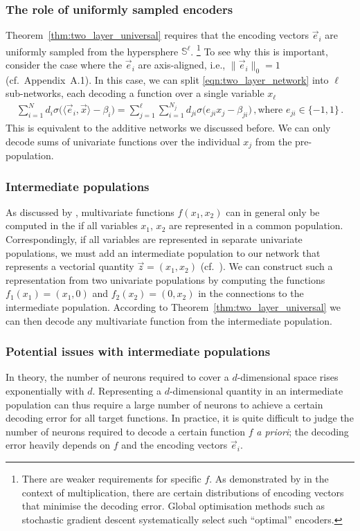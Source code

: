 \subsubsection{The role of uniformly sampled encoders}
Theorem~\ref{thm:two_layer_universal} requires that the encoding vectors $\vec e_i$ are uniformly sampled from the hypersphere $\mathbb{S}^\ell$.%
\footnote{There are weaker requirements for specific $f$.
As demonstrated by \citet{gosmann2015precise} in the context of multiplication, there are certain distributions of encoding vectors that minimise the decoding error.
Global optimisation methods such as stochastic gradient descent systematically select such \enquote{optimal} encoders.}
To see why this is important, consider the case where the $\vec e_i$ are axis-aligned, i.e., $\|\vec e_i\|_0 = 1$ (cf.~Appendix~A.1).
In this case, we can split \cref{eqn:two_layer_network} into $\ell$ sub-networks, each decoding a function over a single variable $x_\ell$
\begin{align*}
		\sum_{i = 1}^N d_i \sigma\bigl( \langle \vec e_i, \vec x \rangle - \beta_i \bigr)
	= 	\sum_{j = 1}^\ell \sum_{i = 1}^{N_j} d_{j i} \sigma\bigl( e_{j i} x_j - \beta_{j i} \bigr) \,, \text{where } e_{j i} \in \{ -1, 1\} \,.
\end{align*}
This is equivalent to the additive networks we discussed before.
We can only decode sums of univariate functions over the individual $x_j$ from the pre-population.

\subsubsection{Intermediate populations}
As discussed by \citet[Chapter~6]{eliasmith2003neural}, multivariate functions $f(x_1, x_2)$ can in general only be computed in the \NEF if all variables $x_1$, $x_2$ are represented in a common population.
Correspondingly, if all variables are represented in separate univariate populations, we must add an intermediate population to our network that represents a vectorial quantity $\vec z = (x_1, x_2)$ (cf.~).
We can construct such a representation from two univariate populations by computing the functions $f_1(x_1) = (x_1, 0)$ and $f_2(x_2) = (0, x_2)$ in the connections to the intermediate population.
According to Theorem~\ref{thm:two_layer_universal} we can then decode any multivariate function from the intermediate population.

\subsubsection{Potential issues with intermediate populations}
In theory, the number of neurons required to cover a $d$-dimensional space rises exponentially with $d$.
Representing a $d$-dimensional quantity in an intermediate population can thus require a large number of neurons to achieve a certain decoding error for all target functions.
In practice, it is quite difficult to judge the number of neurons required to decode a certain function $f$ \emph{a priori}; the decoding error heavily depends on $f$ and the encoding vectors $\vec e_i$.

